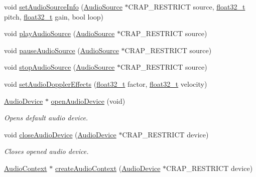 \begin{DoxyCompactItemize}
\item 
void \hyperlink{namespacecrap_a4fd4860c7cb595ae4678703680d45f56}{set\+Audio\+Source\+Info} (\hyperlink{namespacecrap_a462d678db37c6a434145136ab6d59720}{Audio\+Source} $\ast$C\+R\+A\+P\+\_\+\+R\+E\+S\+T\+R\+I\+C\+T source, \hyperlink{crap__types_8h_a4611b605e45ab401f02cab15c5e38715}{float32\+\_\+t} pitch, \hyperlink{crap__types_8h_a4611b605e45ab401f02cab15c5e38715}{float32\+\_\+t} gain, bool loop)
\item 
void \hyperlink{namespacecrap_a4c9e443f838fdaa672cdac9a99c476c8}{play\+Audio\+Source} (\hyperlink{namespacecrap_a462d678db37c6a434145136ab6d59720}{Audio\+Source} $\ast$C\+R\+A\+P\+\_\+\+R\+E\+S\+T\+R\+I\+C\+T source)
\item 
void \hyperlink{namespacecrap_ae71e126c8b6319ea607fb4af874c15cf}{pause\+Audio\+Source} (\hyperlink{namespacecrap_a462d678db37c6a434145136ab6d59720}{Audio\+Source} $\ast$C\+R\+A\+P\+\_\+\+R\+E\+S\+T\+R\+I\+C\+T source)
\item 
void \hyperlink{namespacecrap_afe2ccaeafe2283bb11626085358de2ae}{stop\+Audio\+Source} (\hyperlink{namespacecrap_a462d678db37c6a434145136ab6d59720}{Audio\+Source} $\ast$C\+R\+A\+P\+\_\+\+R\+E\+S\+T\+R\+I\+C\+T source)
\item 
void \hyperlink{namespacecrap_abc5f005100a0bcf817e82185e209d517}{set\+Audio\+Doppler\+Effects} (\hyperlink{crap__types_8h_a4611b605e45ab401f02cab15c5e38715}{float32\+\_\+t} factor, \hyperlink{crap__types_8h_a4611b605e45ab401f02cab15c5e38715}{float32\+\_\+t} velocity)
\item 
\hyperlink{namespacecrap_a0554191481198902f832204ecc2db4c0}{Audio\+Device} $\ast$ \hyperlink{namespacecrap_a39c24b21c6d1272568c835ac1a2a76f8}{open\+Audio\+Device} (void)
\begin{DoxyCompactList}\small\item\em Opens default audio device. \end{DoxyCompactList}\item 
void \hyperlink{namespacecrap_ae9eb7aeb6dd0d2e93fb4be25d75f65a9}{close\+Audio\+Device} (\hyperlink{namespacecrap_a0554191481198902f832204ecc2db4c0}{Audio\+Device} $\ast$C\+R\+A\+P\+\_\+\+R\+E\+S\+T\+R\+I\+C\+T device)
\begin{DoxyCompactList}\small\item\em Closes opened audio device. \end{DoxyCompactList}\item 
\hyperlink{namespacecrap_a4d9ca11977af369032d36460bc1c80e7}{Audio\+Context} $\ast$ \hyperlink{namespacecrap_a1a6cf0539f6ee95ac516c2828f20f0ec}{create\+Audio\+Context} (\hyperlink{namespacecrap_a0554191481198902f832204ecc2db4c0}{Audio\+Device} $\ast$C\+R\+A\+P\+\_\+\+R\+E\+S\+T\+R\+I\+C\+T device)

\end{DoxyCompactItemize}
